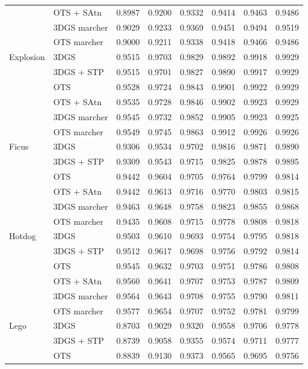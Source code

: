 \begin{longtable}[H]{llrrrrrr}
 & OTS + SAtn & 0.8987 & 0.9200 & 0.9332 & 0.9414 & 0.9463 & 0.9486 \\
 & 3DGS marcher & 0.9029 & 0.9233 & 0.9369 & 0.9451 & 0.9494 & 0.9519 \\
 & OTS marcher & 0.9000 & 0.9211 & 0.9338 & 0.9418 & 0.9466 & 0.9486 \\
Explosion & 3DGS & 0.9515 & 0.9703 & 0.9829 & 0.9892 & 0.9918 & 0.9929 \\
 & 3DGS + STP & 0.9515 & 0.9701 & 0.9827 & 0.9890 & 0.9917 & 0.9929 \\
 & OTS & 0.9528 & 0.9724 & 0.9843 & 0.9901 & 0.9922 & 0.9929 \\
 & OTS + SAtn & 0.9535 & 0.9728 & 0.9846 & 0.9902 & 0.9923 & 0.9929 \\
 & 3DGS marcher & 0.9545 & 0.9732 & 0.9852 & 0.9905 & 0.9923 & 0.9925 \\
 & OTS marcher & 0.9549 & 0.9745 & 0.9863 & 0.9912 & 0.9926 & 0.9926 \\
Ficus & 3DGS & 0.9306 & 0.9534 & 0.9702 & 0.9816 & 0.9871 & 0.9890 \\
 & 3DGS + STP & 0.9309 & 0.9543 & 0.9715 & 0.9825 & 0.9878 & 0.9895 \\
 & OTS & 0.9442 & 0.9604 & 0.9705 & 0.9764 & 0.9799 & 0.9814 \\
 & OTS + SAtn & 0.9442 & 0.9613 & 0.9716 & 0.9770 & 0.9803 & 0.9815 \\
 & 3DGS marcher & 0.9463 & 0.9648 & 0.9758 & 0.9823 & 0.9855 & 0.9868 \\
 & OTS marcher & 0.9435 & 0.9608 & 0.9715 & 0.9778 & 0.9808 & 0.9818 \\
Hotdog & 3DGS & 0.9503 & 0.9610 & 0.9693 & 0.9754 & 0.9795 & 0.9818 \\
 & 3DGS + STP & 0.9512 & 0.9617 & 0.9698 & 0.9756 & 0.9792 & 0.9814 \\
 & OTS & 0.9545 & 0.9632 & 0.9703 & 0.9751 & 0.9786 & 0.9808 \\
 & OTS + SAtn & 0.9560 & 0.9641 & 0.9707 & 0.9753 & 0.9787 & 0.9809 \\
 & 3DGS marcher & 0.9564 & 0.9643 & 0.9708 & 0.9755 & 0.9790 & 0.9811 \\
 & OTS marcher & 0.9577 & 0.9654 & 0.9707 & 0.9752 & 0.9781 & 0.9799 \\
Lego & 3DGS & 0.8703 & 0.9029 & 0.9320 & 0.9558 & 0.9706 & 0.9778 \\
 & 3DGS + STP & 0.8739 & 0.9058 & 0.9355 & 0.9574 & 0.9711 & 0.9777 \\
 & OTS & 0.8839 & 0.9130 & 0.9373 & 0.9565 & 0.9695 & 0.9756 \\

\end{longtable}
